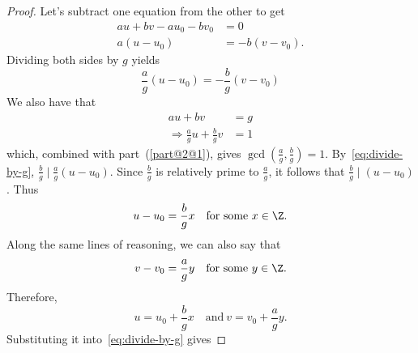 \documentclass[
  coursecode={MTHE 418},
  assignmentname={Homework \homeworknumber},
  studentnumber=20053722,
  name={Bryan Hoang},
  draft,
  final,
]{
  ltxanswer%
}
\begin{document}
\begin{questions}
\begin{parts}
      \part{}
      \begin{solution}

      \end{solution}

      \part{}
      \begin{solution}
        \begin{proof}
          Let's subtract one equation from the other to get
          \begin{align*}
            au + bv - au_{0} - bv_{0} &= 0              \\
            a(u - u_{0})              &= -b(v - v_{0}).
          \end{align*}
          Dividing both sides by \(g\) yields
          \begin{equation}\label{eq:divide-by-g}
            \frac{a}{g}(u - u_{0}) = -\frac{b}{g}(v - v_{0})
          \end{equation}
          We also have that
          \begin{align*}
            au + bv                                 &= g \\
            \Rightarrow \frac{a}{g}u + \frac{b}{g}v &= 1
          \end{align*}
          which, combined with part~(\ref{part@2@1}), gives \(\gcd(\frac{a}{g}, \frac{b}{g}) = 1\). By~\eqref{eq:divide-by-g}, \(\frac{b}{g} \mid \frac{a}{g}(u - u_{0})\). Since \(\frac{b}{g}\) is relatively prime to \(\frac{a}{g}\), it follows that \(\frac{b}{g} \mid (u - u_{0})\). Thus
          \begin{equation*}
            u - u_{0} = \frac{b}{g}x \quad \text{for some}\ x \in \Z.
          \end{equation*}
          Along the same lines of reasoning, we can also say that
          \begin{equation*}
            v - v_{0} = \frac{a}{g}y \quad \text{for some}\ y \in \Z.
          \end{equation*}
          Therefore,
          \begin{equation*}
            u = u_{0} + \frac{b}{g}x \quad \text{and}\ v = v_{0} + \frac{a}{g}y.
          \end{equation*}
          Substituting it into~\eqref{eq:divide-by-g} gives

\end{proof}
\end{solution}
\end{parts}
\end{questions}
\end{document}
